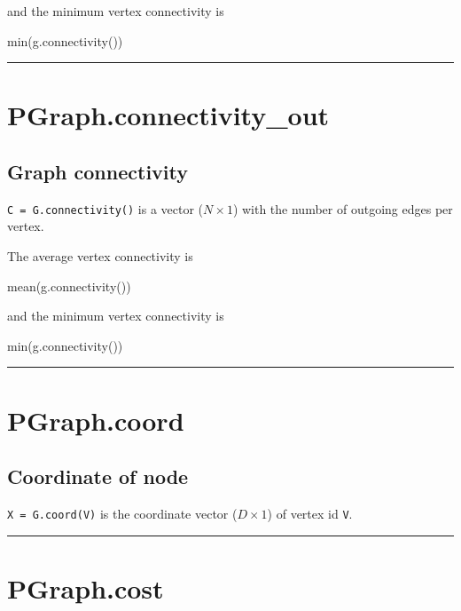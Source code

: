 and the minimum vertex connectivity is

\begin{Code}
   min(g.connectivity())

\end{Code}
\vspace{1.5ex}\hrule

\hypertarget{PGraph.connectivity\_out}{\section*{PGraph.connectivity\_out}}
\subsection*{Graph connectivity}


\texttt{C = G.connectivity()} is a vector ($N \times 1$) with the number of outgoing edges per
vertex.



The average vertex connectivity is

\begin{Code}
   mean(g.connectivity())

\end{Code}


and the minimum vertex connectivity is

\begin{Code}
   min(g.connectivity())

\end{Code}
\vspace{1.5ex}\hrule

\hypertarget{PGraph.coord}{\section*{PGraph.coord}}
\subsection*{Coordinate of node}


\texttt{X = G.coord(V)} is the coordinate vector ($D \times 1$) of vertex id \texttt{V}.

\vspace{1.5ex}\hrule

\hypertarget{PGraph.cost}{\section*{PGraph.cost}}
